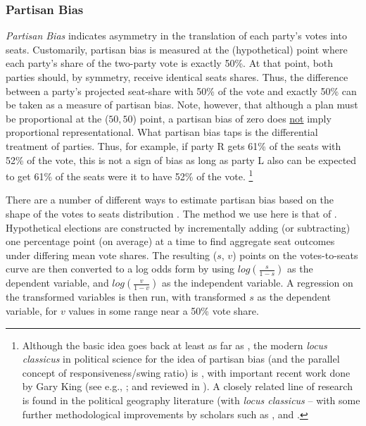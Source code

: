             \subsubsection*{Partisan Bias}
%
    \textit{Partisan Bias} indicates asymmetry in the translation of each party’s votes into seats. Customarily, partisan bias is measured at the (hypothetical) point where each party’s share of the two-party vote is exactly 50\%. At that point, both parties should, by symmetry, receive identical seats shares. Thus, the difference between a party’s projected seat-share with 50\% of the vote and exactly 50\% can be taken as a measure of partisan bias. Note, however, that although a plan must be proportional at the ($50,50$) point, a partisan bias of zero does \underline{not} imply proportional representational. What partisan bias taps is the differential treatment of parties. Thus, for example, if party R gets 61\% of the seats with 52\% of the vote, this is not a sign of bias as long as party L also can be expected to get 61\% of the seats were it to have 52\% of the vote.
        \footnote{Although the basic idea goes back at least as far as \citet{Dahl1956}, the modern \textit{locus classicus} in political science for the idea of partisan bias (and the parallel concept of responsiveness/swing ratio) is \citet{Tufte1973}, with important recent work done by Gary King (see e.g., \citep{GelmanKing1994_unifiedAJPS}; and reviewed in \citet{GrofmanKing2007_ELJ}). A closely related line of research is found in the political geography literature (with \textit{locus classicus} \citet{Brookes1959, Brookes1960} -- with some further methodological improvements by scholars such as \citet{Johnston1994, Rossiter1997}, and \citet{Johnston2002}.}   
\par
    There are a number of different ways to estimate partisan bias based on the shape of the votes to seats distribution \citep{Tufte1973, Grofman1983, Browning_King_1987_seats_votes, GelmanKing1994_unifiedAJPS, Grofman_et_al_1997_SwingRatio_Bias, Zingher2016_bias_swingratio_JEPP}. The method we use here is that of \citet{Tufte1973}. Hypothetical elections are constructed by incrementally adding (or subtracting) one percentage point (on average) at a time to find aggregate seat outcomes under differing mean vote shares. The resulting ($s$, $v$) points on the votes-to-seats curve are then converted to a log odds form by using $ log(\frac{s}{1-s}) $ as the dependent variable, and $ log(\frac{v}{1-v}) $ as the independent variable. A regression on the transformed variables is then run, with transformed $s$ as the dependent variable, for $v$ values in some range near a 50\% vote share. 
